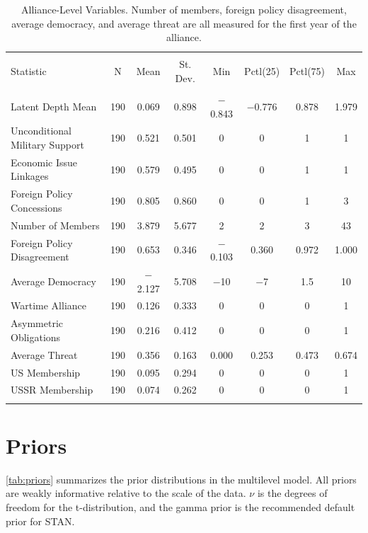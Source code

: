\documentclass[12pt]{article}
\begin{document}
\begin{table}[!htbp] \centering 
  \caption{Alliance-Level Variables. Number of members, foreign policy disagreement, average democracy, and average threat are all measured for the first year of the alliance.} 
  \label{tab:all-level-sum} 
\begin{tabular}{@{\extracolsep{5pt}}lccccccc} 
\\[-1.8ex]\hline 
\hline \\[-1.8ex] 
Statistic & \multicolumn{1}{c}{N} & \multicolumn{1}{c}{Mean} & \multicolumn{1}{c}{St. Dev.} & \multicolumn{1}{c}{Min} & \multicolumn{1}{c}{Pctl(25)} & \multicolumn{1}{c}{Pctl(75)} & \multicolumn{1}{c}{Max} \\ 
\hline \\[-1.8ex] 
Latent Depth Mean & 190 & 0.069 & 0.898 & $-$0.843 & $-$0.776 & 0.878 & 1.979 \\ 
Unconditional Military Support & 190 & 0.521 & 0.501 & 0 & 0 & 1 & 1 \\ 
Economic Issue Linkages & 190 & 0.579 & 0.495 & 0 & 0 & 1 & 1 \\ 
Foreign Policy Concessions & 190 & 0.805 & 0.860 & 0 & 0 & 1 & 3 \\ 
Number of Members& 190 & 3.879 & 5.677 & 2 & 2 & 3 & 43 \\ 
Foreign Policy Disagreement & 190 & 0.653 & 0.346 & $-$0.103 & 0.360 & 0.972 & 1.000 \\ 
Average Democracy & 190 & $-$2.127 & 5.708 & $-$10 & $-$7 & 1.5 & 10 \\ 
Wartime Alliance & 190 & 0.126 & 0.333 & 0 & 0 & 0 & 1 \\ 
Asymmetric Obligations & 190 & 0.216 & 0.412 & 0 & 0 & 0 & 1 \\ 
Average Threat & 190 & 0.356 & 0.163 & 0.000 & 0.253 & 0.473 & 0.674 \\ 
US Membership & 190 & 0.095 & 0.294 & 0 & 0 & 0 & 1 \\ 
USSR Membership & 190 & 0.074 & 0.262 & 0 & 0 & 0 & 1 \\ 
\hline \\[-1.8ex] 
\end{tabular} 
\end{table} 



\section{Priors}

\autoref{tab:priors} summarizes the prior distributions in the multilevel model. 
All priors are weakly informative relative to the scale of the data. 
$\nu$ is the degrees of freedom for the t-distribution, and the gamma prior is the recommended default prior for STAN. 
\end{document}
